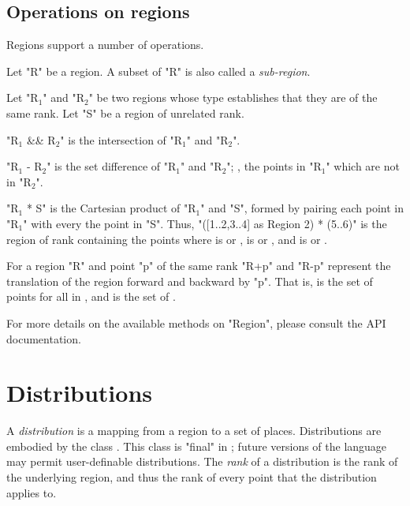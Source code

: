 \subsection{Operations on regions}

Regions support a number of operations. 

Let \xcd"R" be a region. A subset of \xcd"R" is also called a
{\em sub-region}.

Let \xcdmath"R$_1$" and \xcdmath"R$_2$" be two regions whose type
establishes that they are of the same rank. Let 
\xcdmath"S" be a region of unrelated rank.

\xcdmath"R$_1$ && R$_2$" is the intersection of \xcdmath"R$_1$" and
\xcdmath"R$_2$".  


\xcdmath"R$_1$ - R$_2$" is the set difference of \xcdmath"R$_1$" and
\xcdmath"R$_2$"; \viz, the points in \xcdmath"R$_1$" which are not in \xcdmath"R$_2$".

\xcdmath"R$_1$ * S" is the Cartesian product of \xcdmath"R$_1$" and
\xcdmath"S",  formed by pairing each point in \xcdmath"R$_1$" with every the point in \xcdmath"S".
Thus, \xcd"([1..2,3..4] as Region 2) * (5..6)"
is the region of rank  containing the points 
where  is  or , 
 is  or , and
 is  or . 


For a region \xcdmath"R" and point \xcdmath"p" of the same rank 
\xcdmath"R+p" and \xcdmath"R-p" represent the translation of the region
forward and backward by \xcdmath"p". That is,  is the set of points
 for all  in , and  is the set of .

For more details on the available methods on \xcdmath"Region", please
consult the API documentation.


\section{Distributions}\label{XtenDistributions}

A {\em distribution} is a mapping from a region to a set of places.
Distributions are embodied by the class .
This class is \xcd"final" in
{}\XtenCurrVer; future versions of the language may permit
user-definable distributions. 
The {\em rank} of a distribution is the rank of the underlying region, and
thus the rank of every point that the distribution applies to.



